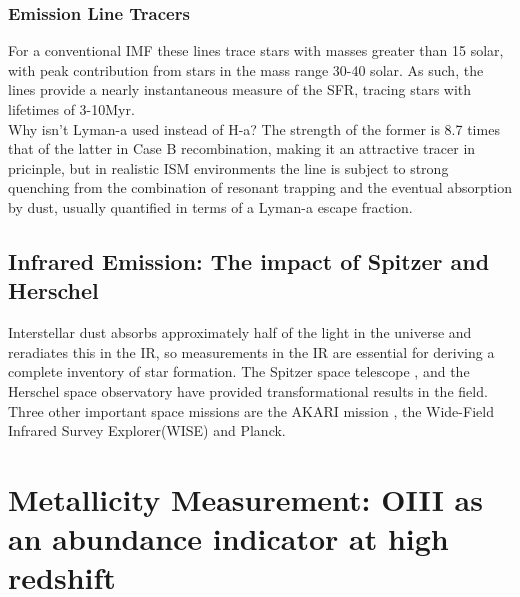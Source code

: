 \documentclass{literature}
\begin{document}
\subsubsection{Emission Line Tracers}
For a conventional IMF these lines trace stars with masses greater than 15 solar, with peak contribution from stars in the mass range 30-40 solar. As such, the lines provide a nearly instantaneous measure of the SFR, tracing stars with lifetimes of 3-10Myr. \\ 
Why isn't Lyman-a used instead of H-a? The strength of the former is 8.7 times that of the latter in Case B recombination, making it an attractive tracer in pricinple, but in realistic ISM environments the line is subject to strong quenching from the combination of resonant trapping and the eventual absorption by dust, usually quantified in terms of a Lyman-a escape fraction. 
\subsection{Infrared Emission: The impact of Spitzer and Herschel}
Interstellar dust absorbs approximately half of the light in the universe and reradiates this in the IR, so measurements in the IR are essential for deriving a complete inventory of star formation. The Spitzer space telescope \citep{Gehrz_2007}, \citep{Werner2004} and the Herschel space observatory \citep{Pilbratt2010} have provided transformational results in the field. Three other important space missions are the AKARI mission \citep{Murakami2007a}, the Wide-Field Infrared Survey Explorer(WISE) \cite{Wright2010} and Planck. 





	
\section{Metallicity Measurement: OIII as an abundance indicator at high redshift}
\end{document}
